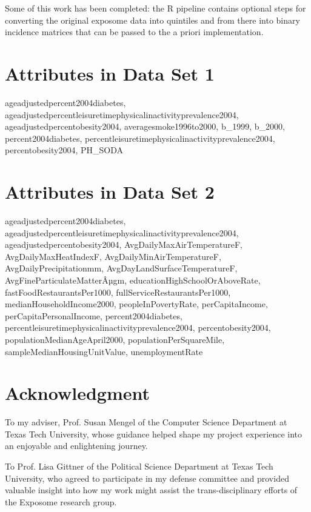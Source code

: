 \documentclass[conference,compsoc]{IEEEtran}
\begin{document}
Some of this work has been completed: the R pipeline contains optional steps for converting the original exposome data into quintiles and from there
into binary incidence matrices that can be passed to the a priori implementation.

\begin{appendices}

\section{Attributes in Data Set 1}
\label{appendix:dataset1}

ageadjustedpercent2004diabetes, 
ageadjustedpercentleisuretimephysicalinactivityprevalence2004, 
ageadjustedpercentobesity2004, 
averagesmoke1996to2000,
b\_1999,
b\_2000,
percent2004diabetes,
percentleisuretimephysicalinactivityprevalence2004,
percentobesity2004, 
PH\_SODA

\section{Attributes in Data Set 2}
\label{appendix:dataset2}

ageadjustedpercent2004diabetes,
ageadjustedpercentleisuretimephysicalinactivityprevalence2004, 
ageadjustedpercentobesity2004, 
AvgDailyMaxAirTemperatureF, 
AvgDailyMaxHeatIndexF, 
AvgDailyMinAirTemperatureF, 
AvgDailyPrecipitationmm, 
AvgDayLandSurfaceTemperatureF, 
AvgFineParticulateMatterÂµgm, 
educationHighSchoolOrAboveRate, 
fastFoodRestaurantsPer1000,
fullServiceRestaurantsPer1000,
medianHouseholdIncome2000, 
peopleInPovertyRate, 
perCapitaIncome, 
perCapitaPersonalIncome, 
percent2004diabetes, 
percentleisuretimephysicalinactivityprevalence2004, 
percentobesity2004, 
populationMedianAgeApril2000, 
populationPerSquareMile, 
sampleMedianHousingUnitValue, 
unemploymentRate

\end{appendices}

\section*{Acknowledgment}

To my adviser, Prof. Susan Mengel of the Computer Science Department at Texas Tech University, whose guidance helped shape
my project experience into an enjoyable and enlightening journey.

To Prof. Lisa Gittner of the Political Science Department at Texas Tech University, who agreed to participate in my defense
committee and provided valuable insight into how my work might assist the trans-disciplinary efforts of the Exposome research group.
\end{document}
